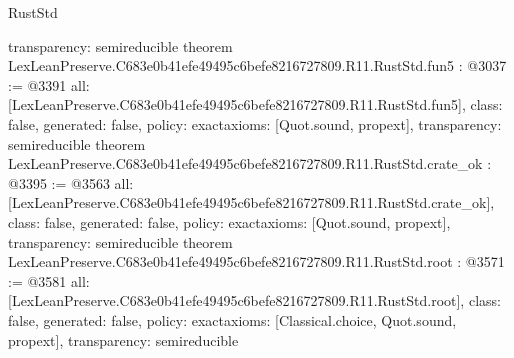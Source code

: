 \begin{lexlean}{RustStd}
\begin{coremodule}
{  transparency: semireducible
}
theorem LexLeanPreserve.C683e0b41efe49495c6befe8216727809.R11.RustStd.fun5 : @3037 := @3391 {
  all: [LexLeanPreserve.C683e0b41efe49495c6befe8216727809.R11.RustStd.fun5],
  class: false,
  generated: false,
  policy: exact{axioms: [Quot.sound, propext]},
  transparency: semireducible
}
theorem LexLeanPreserve.C683e0b41efe49495c6befe8216727809.R11.RustStd.crate_ok : @3395 := @3563 {
  all: [LexLeanPreserve.C683e0b41efe49495c6befe8216727809.R11.RustStd.crate_ok],
  class: false,
  generated: false,
  policy: exact{axioms: [Quot.sound, propext]},
  transparency: semireducible
}
theorem LexLeanPreserve.C683e0b41efe49495c6befe8216727809.R11.RustStd.root : @3571 := @3581 {
  all: [LexLeanPreserve.C683e0b41efe49495c6befe8216727809.R11.RustStd.root],
  class: false,
  generated: false,
  policy: exact{axioms: [Classical.choice, Quot.sound, propext]},
  transparency: semireducible
}


\end{coremodule}
\end{lexlean}
